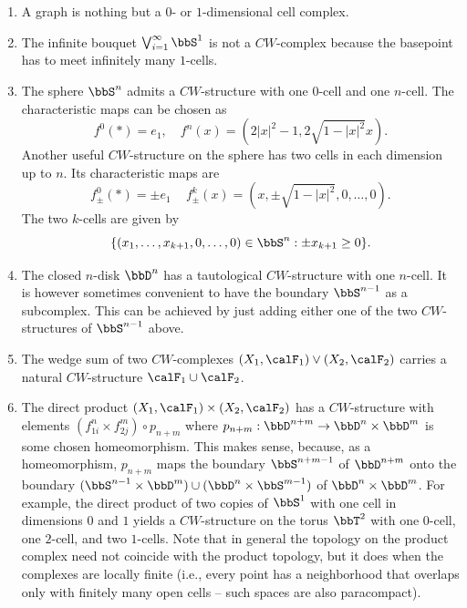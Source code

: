 \begin{example}
    \begin{enumerate}
        \item A graph is nothing but a $0$- or $1$-dimensional cell complex.
        \item The infinite bouquet $\bigvee_{i=1}^\infty \bbS^1$ is not a $CW$-complex because the basepoint has to meet infinitely many $1$-cells.
        \item The sphere $\bbS^n$ admits a $CW$-structure with one $0$-cell and one $n$-cell. The characteristic maps can be chosen as 
        \[f^0(*)=e_1,\quad f^n(x)=(2|x|^2-1,2\sqrt{1-|x|^2}x).\]
        Another useful $CW$-structure on the sphere has two cells in each dimension up to $n$. Its characteristic maps are
        \[f^0_\pm (*)=\pm e_1\,\quad f^k_\pm(x)=(x,\pm\sqrt{1-|x|^2},0,\ldots,0).\]
        The two $k$-cells are given by
        \[\{(x_1,\ldots,x_{k+1},0,\ldots,0)\in \bbS^n:\pm x_{k+1}\geq 0\}.\]
        \item The closed $n$-disk $\bbD^n$ has a tautological $CW$-structure with one $n$-cell. It is however sometimes convenient to have the boundary $\bbS^{n-1}$ as a subcomplex. This can be achieved by just adding either one of the two $CW$-structures of $\bbS^{n-1}$ above.
        \item The wedge sum of two $CW$-complexes $(X_1,\calF _1)\vee (X_2,\calF _2)$ carries a natural $CW$-structure $\calF _1\cup \calF _2$.
        \item The direct product $(X_1,\calF _1)\times (X_2,\calF _2)$ has a $CW$-structure with elements $(f_{1i}^n\times f_{2j}^m)\circ p_{n+m}$ where $p_{n+m}:\bbD^{n+m}\to \bbD^n\times \bbD^m$ is some chosen homeomorphism. This makes sense, because, as a homeomorphism, $p_{n+m}$ maps the boundary $\bbS^{n+m-1}$ of $\bbD^{n+m}$ onto the boundary $(\bbS^{n-1}\times \bbD^m)\cup (\bbD^n\times \bbS^{m-1})$ of $\bbD^n\times \bbD^m$. For example, the direct product of two copies of $\bbS^1$ with one cell in dimensions $0$ and $1$ yields a $CW$-structure on the torus $\bbT^2$ with one $0$-cell, one $2$-cell, and two $1$-cells. Note that in general the topology on the product complex need not coincide with the product topology, but it does when the complexes are locally finite (i.e., every point has a neighborhood that overlaps only with finitely many open cells -- such spaces are also paracompact).
    \end{enumerate}
\end{example}

